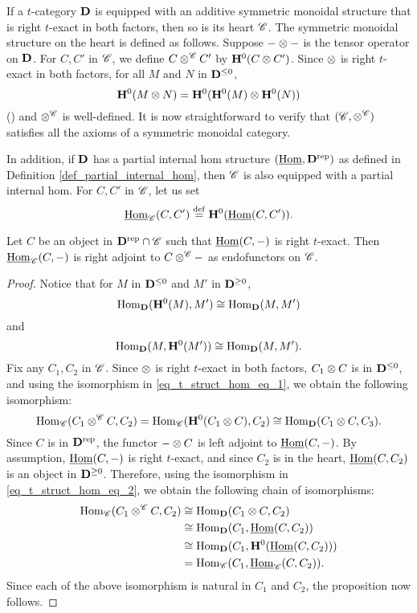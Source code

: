 If a $t$-category $\mathbf{D}$ is equipped with an additive symmetric 
monoidal structure that is right $t$-exact in both factors, then 
so is its heart $\mathscr{C}$. The symmetric monoidal structure on
the heart is defined as follows. Suppose $- \otimes -$ is the 
tensor operator on $\mathbf{D}$. For $C, C'$ in $\mathscr{C}$, we define $C 
\otimes^{\mathscr{C}} C'$ by $\mathbf{H}^0(C \otimes C')$. 
Since $\otimes$ is right $t$-exact in both factors, for all $M$ 
and $N$ in $\mathbf{D}^{\leq 0}$,
\[
\mathbf{H}^0(M \otimes N) = \mathbf{H}^0(\mathbf{H}^0(M) \otimes \mathbf{H}^0(N))
\]
(\cite[5.10]{DegModHom}) and $\otimes^{\mathscr{C}}$ is well-defined.
It is now straightforward to verify that $(\mathscr{C}, 
\otimes^{\mathscr{C}})$ satisfies all the axioms of a symmetric 
monoidal category. 

In addition, if $\mathbf{D}$ has a partial internal hom structure
$(\underline{\mathrm{Hom}}, \mathbf{D}^{\mathrm{rep}})$ as defined in Definition 
\ref{def_partial_internal_hom}, then $\mathscr{C}$ is also equipped
with a partial internal hom. For $C, C'$ in $\mathscr{C}$, let us
set
\[
\underline{\mathrm{Hom}}_{\mathscr{C}}(C, C') \stackrel{\mathrm{def}}{=} \mathbf{H}^0(\underline{\mathrm{Hom}}(C, C')).
\]
\begin{prop}\label{prop_ihomC_is_partial_ihom}
Let $C$ be an object in $\mathbf{D}^{\mathrm{rep}} \cap \mathscr{C}$ such that 
$\underline{\mathrm{Hom}}(C, -)$ is right $t$-exact. Then $\underline{\mathrm{Hom}}_{\mathscr{C}}(C, -)$ is 
right adjoint to $C \otimes^{\mathscr{C}} -$ as endofunctors on 
$\mathscr{C}$.
\end{prop}
\begin{proof}
Notice that for $M$ in $\mathbf{D}^{\leq 0}$ and $M'$ in 
$\mathbf{D}^{\geq 0}$,
\begin{equation}\label{eq_t_struct_hom_eq_1}
\mathrm{Hom}_{\mathbf{D}}(\mathbf{H}^0(M), M') \cong \mathrm{Hom}_{\mathbf{D}}(M, M')
\end{equation}
and
\begin{equation}\label{eq_t_struct_hom_eq_2}
\mathrm{Hom}_{\mathbf{D}}(M, \mathbf{H}^0(M')) \cong \mathrm{Hom}_{\mathbf{D}}(M, M').
\end{equation}
Fix any $C_1, C_2$ in $\mathscr{C}$. Since $\otimes$ is right 
$t$-exact in both factors, $C_1 \otimes C$ is in $\mathbf{D}^{\leq 0}$, 
and using the isomorphism in \eqref{eq_t_struct_hom_eq_1}, we 
obtain the following isomorphism:
\[
\mathrm{Hom}_{\mathscr{C}}(C_1 \otimes^{\mathscr{C}} C, C_2) = 
\mathrm{Hom}_{\mathscr{C}}(\mathbf{H}^0(C_1 \otimes C), C_2) 
\cong \mathrm{Hom}_{\mathbf{D}}(C_1 \otimes C, C_3).
\]
Since $C$ is in $\mathbf{D}^{\mathrm{rep}}$, the functor $- \otimes C$ is 
left adjoint to $\underline{\mathrm{Hom}}(C, -)$. By assumption, $\underline{\mathrm{Hom}}(C, -)$ is 
right $t$-exact, and since $C_2$ is in the heart, $\underline{\mathrm{Hom}}(C, C_2)$ 
is an object in $\mathbf{D}^{\geq 0}$. Therefore, using the isomorphism 
in \eqref{eq_t_struct_hom_eq_2}, we obtain the following chain of
isomorphisms:
\begin{align*}
\mathrm{Hom}_{\mathscr{C}}(C_1 \otimes^{\mathscr{C}} C, C_2)
&\cong \mathrm{Hom}_{\mathbf{D}}(C_1 \otimes C, C_2) \\
&\cong \mathrm{Hom}_{\mathbf{D}}(C_1, \underline{\mathrm{Hom}}(C, C_2)) \\
&\cong \mathrm{Hom}_{\mathbf{D}}(C_1, \mathbf{H}^0(\underline{\mathrm{Hom}}(C, C_2))) \\
&= \mathrm{Hom}_{\mathscr{C}}(C_1, \underline{\mathrm{Hom}}_{\mathscr{C}}(C, C_2)).
\end{align*}
Since each of the above isomorphism is natural in $C_1$ and $C_2$, 
the proposition now follows.
\end{proof}

